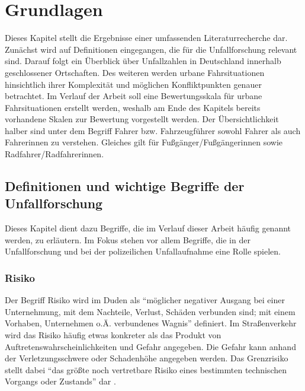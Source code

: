 
\chapter{Grundlagen}\label{chapter:Literaturrecherche}
Dieses Kapitel stellt die Ergebnisse einer umfassenden Literaturrecherche dar. Zunächst wird auf Definitionen eingegangen, die für die Unfallforschung relevant sind. Darauf folgt ein Überblick über Unfallzahlen in Deutschland innerhalb geschlossener Ortschaften. Des weiteren werden urbane Fahrsituationen hinsichtlich ihrer Komplexität und möglichen Konfliktpunkten genauer betrachtet. Im Verlauf der Arbeit soll eine Bewertungsskala für urbane Fahrsituationen erstellt werden, weshalb am Ende des Kapitels bereits vorhandene Skalen zur Bewertung vorgestellt werden. Der Übersichtlichkeit halber sind unter dem Begriff Fahrer bzw. Fahrzeugführer sowohl Fahrer als auch Fahrerinnen zu verstehen. Gleiches gilt für Fußgänger/Fußgängerinnen sowie Radfahrer/Radfahrerinnen.

\section{Definitionen und wichtige Begriffe der Unfallforschung}
Dieses Kapitel dient dazu Begriffe, die im Verlauf dieser Arbeit häufig genannt werden, zu erläutern. Im Fokus stehen vor allem  Begriffe, die in der Unfallforschung und bei der polizeilichen Unfallaufnahme eine Rolle spielen.


\subsection{Risiko}
Der Begriff Risiko wird im Duden als \enquote{möglicher negativer Ausgang bei einer Unternehmung, mit dem Nachteile, Verlust, Schäden verbunden sind; mit einem Vorhaben, Unternehmen o.Ä. verbundenes Wagnis} definiert. Im Straßenverkehr wird das Risiko häufig etwas konkreter als das Produkt von Auftretenswahrscheinlichkeiten und Gefahr angegeben. Die Gefahr kann anhand der Verletzungsschwere \parencite[S. 151f.]{Huguenin.2017} oder Schadenhöhe \parencite[S. 60]{Gschwendtner.2015} angegeben werden. Das Grenzrisiko stellt dabei \enquote{das größte noch vertretbare Risiko eines bestimmten technischen Vorgangs oder Zustands} dar \parencite[S. 43]{Hillenbrand.2012}.

